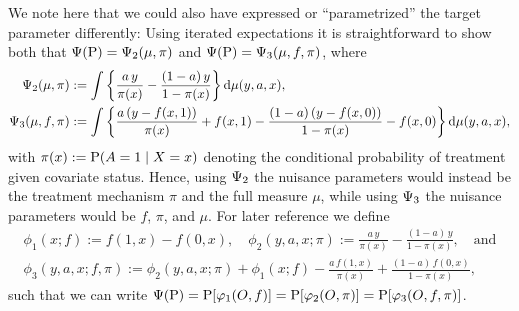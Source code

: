 \documentclass[a4,danish]{article}
\begin{document}
We note here that we could also have expressed or ``parametrized'' the target parameter differently:
Using iterated expectations it is straightforward to show both that $\TT(\P) = \TT_2(\mu, \pi)$ and
$\TT(\P) = \TT_3(\mu, f, \pi)$, where
\begin{align*}
  \TT_2(\mu, \pi) & := \int 
                    \left\{
                    \frac{a\,y}{\pi(x)} - \frac{(1-a)\,y}{1-\pi(x)} 
                    \right\}\diff \mu(y,a,x),\\
  \TT_3(\mu, f, \pi) &:=
                       \int 
                       \left\{
                       \frac{a\,(y-f(x,1))}{\pi(x)} + f(x,1) - \frac{(1-a)\,(y-f(x,0))}{1-\pi(x)} - f(x,0)
                       \right\}\diff \mu(y,a,x),
\end{align*}
with $\pi(x) := \P(A=1 \mid X=x)$ denoting the conditional probability of treatment given covariate
status. Hence, using $\TT_2$ the nuisance parameters would instead be the treatment mechanism $\pi$
and the full measure $\mu$, while using $\TT_3$ the nuisance parameters would be $f$, $\pi$, and
$\mu$. For later reference we define
\begin{equation}
  \label{eq:ate-pars}
  \begin{gathered}
    \phi_1(x; f) := f(1,x) - f(0,x), \quad
    \phi_2(y,a,x; \pi) := \frac{a\,y}{\pi(x)} - \frac{(1-a)\,y}{1-\pi(x)},\quad \text{and}  \\
    \phi_3(y,a,x; f, \pi) := \phi_2(y,a,x; \pi) + \phi_1(x; f) - \frac{a\,f(1,x)}{\pi(x)} +
    \frac{(1-a)\,f(0,x)}{1-\pi(x)},
  \end{gathered}
\end{equation}
such that we can write $\TT(\P) = \P[\phi_1(O, f)] = \P[\phi_2(O, \pi)] = \P[\phi_3(O, f, \pi)]$.
\end{document}
